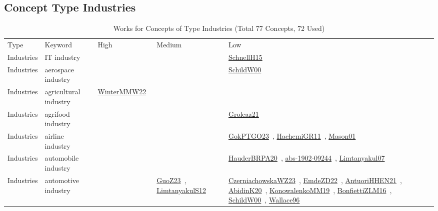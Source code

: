 \clearpage
\subsection{Concept Type Industries}
\label{sec:Industries}
\label{Industries}
{\scriptsize
\begin{longtable}{lp{3cm}>{\raggedright\arraybackslash}p{6cm}>{\raggedright\arraybackslash}p{6cm}>{\raggedright\arraybackslash}p{8cm}}
\rowcolor{white}\caption{Works for Concepts of Type Industries (Total 77 Concepts, 72 Used)}\\ \toprule
\rowcolor{white}Type & Keyword & High & Medium & Low\\ \midrule\endhead
\bottomrule
\endfoot
\index{IT industry}\index{Industries!IT industry}Industries & IT industry &  &  & \href{../works/SchnellH15.pdf}{SchnellH15}~\cite{SchnellH15}\\
\index{aerospace industry}\index{Industries!aerospace industry}Industries & aerospace industry &  &  & \href{../works/SchildW00.pdf}{SchildW00}~\cite{SchildW00}\\
\index{agricultural industry}\index{Industries!agricultural industry}Industries & agricultural industry & \href{../works/WinterMMW22.pdf}{WinterMMW22}~\cite{WinterMMW22} &  & \\
\index{agrifood industry}\index{Industries!agrifood industry}Industries & agrifood industry &  &  & \href{../works/Groleaz21.pdf}{Groleaz21}~\cite{Groleaz21}\\
\index{airline industry}\index{Industries!airline industry}Industries & airline industry &  &  & \href{../works/GokPTGO23.pdf}{GokPTGO23}~\cite{GokPTGO23}, \href{../works/HachemiGR11.pdf}{HachemiGR11}~\cite{HachemiGR11}, \href{../works/Mason01.pdf}{Mason01}~\cite{Mason01}\\
\index{automobile industry}\index{Industries!automobile industry}Industries & automobile industry &  &  & \href{../works/HauderBRPA20.pdf}{HauderBRPA20}~\cite{HauderBRPA20}, \href{../works/abs-1902-09244.pdf}{abs-1902-09244}~\cite{abs-1902-09244}, \href{../works/Limtanyakul07.pdf}{Limtanyakul07}~\cite{Limtanyakul07}\\
\index{automotive industry}\index{Industries!automotive industry}Industries & automotive industry &  & \href{../works/GuoZ23.pdf}{GuoZ23}~\cite{GuoZ23}, \href{../works/LimtanyakulS12.pdf}{LimtanyakulS12}~\cite{LimtanyakulS12} & \href{../works/CzerniachowskaWZ23.pdf}{CzerniachowskaWZ23}~\cite{CzerniachowskaWZ23}, \href{../works/EmdeZD22.pdf}{EmdeZD22}~\cite{EmdeZD22}, \href{../works/AntuoriHHEN21.pdf}{AntuoriHHEN21}~\cite{AntuoriHHEN21}, \href{../works/AbidinK20.pdf}{AbidinK20}~\cite{AbidinK20}, \href{../works/KonowalenkoMM19.pdf}{KonowalenkoMM19}~\cite{KonowalenkoMM19}, \href{../works/BonfiettiZLM16.pdf}{BonfiettiZLM16}~\cite{BonfiettiZLM16}, \href{../works/SchildW00.pdf}{SchildW00}~\cite{SchildW00}, \href{../works/Wallace96.pdf}{Wallace96}~\cite{Wallace96}\\

\end{longtable}}

